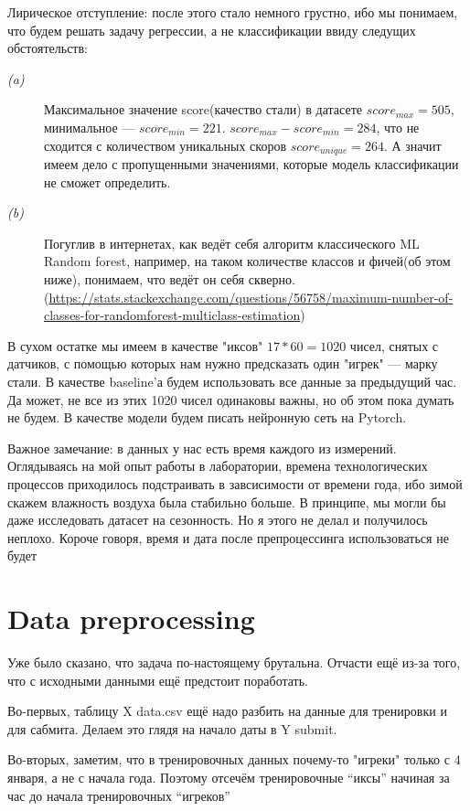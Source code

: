 \documentclass[12pt,a4paper]{report}
\begin{document}
Лирическое отступление: после этого стало немного грустно, ибо мы понимаем, что будем решать задачу регрессии, а не классификации ввиду следущих обстоятельств:
\begin{description}

\item[\itshape (a)] Максимальное значение score(качество стали) в датасете $score_{max} = 505$, минимальное — $score_{min} = 221$. $score_{max} - score_{min} = 284$, что не сходится с количеством уникальных скоров $score_{unique} = 264$. А значит имеем дело с пропущенными значениями, которые модель классификации не сможет определить.
\item[\itshape (b)] Погуглив в интернетах, как ведёт себя алгоритм классического ML Random forest, например, на таком количестве классов и фичей(об этом ниже), понимаем, что ведёт он себя скверно.(\url{https://stats.stackexchange.com/questions/56758/maximum-number-of-classes-for-randomforest-multiclass-estimation})
\end{description}
В сухом остатке мы имеем в качестве "иксов" $17 * 60 = 1020$ чисел, снятых с датчиков, с помощью которых нам нужно предсказать один "игрек" — марку стали. В качестве baseline'а будем использовать все данные за предыдущий час. Да может, не все из этих 1020 чисел одинаковы важны, но об этом пока думать не будем. В качестве модели будем писать нейронную сеть на Pytorch.

Важное замечание: в данных у нас есть время каждого из измерений. Оглядываясь на мой опыт работы в лаборатории, времена технологических процессов приходилось подстраивать в завсисимости от времени года, ибо зимой скажем влажность воздуха была стабильно больше. В принципе, мы могли бы даже исследовать датасет на сезонность. Но я этого не делал и получилось неплохо. Короче говоря, время и дата после препроцессинга использоваться не будет
\section*{Data preprocessing}
Уже было сказано, что задача по-настоящему брутальна. Отчасти ещё из-за того, что с исходными данными ещё предстоит поработать.

Во-первых, таблицу X data.csv ещё надо разбить на данные для тренировки и для сабмита. Делаем это глядя на начало даты в Y submit.

Во-вторых, заметим, что в тренировочных данных почему-то "игреки" только с 4 января, а не с начала года. Поэтому отсечём тренировочные “иксы” начиная за час до начала тренировочных “игреков”
\end{document}
